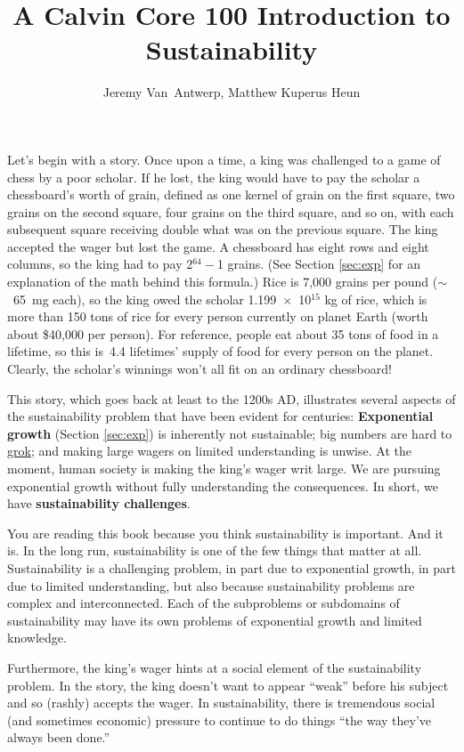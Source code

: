 \documentclass{article}\usepackage[]{graphicx}\usepackage[table]{xcolor}
\begin{document}
\title{A Calvin Core 100 Introduction to Sustainability}
\author{Jeremy Van~Antwerp, Matthew Kuperus Heun}

 
Let’s begin with a story.
Once upon a time, a king was challenged to a game of chess by a poor scholar.
If he lost, the king would have to pay the scholar a chessboard’s worth of
grain, defined as one kernel of grain on the first square, two grains on the second
square, four grains on the third square, and so on, with each subsequent square receiving
double what was on the previous square.
The king accepted the wager but lost the game.
A chessboard
has eight rows and eight columns, so the king had to pay 2$^\text{64}-$1
grains.
(See Section \ref{sec:exp} for an explanation of the math behind this formula.)
Rice is 7,000 grains per pound ($\sim$~65~mg each),
so the king owed the scholar 1.199~$\times$~10$^{\text{15}}$ kg of rice,
which is more than 150 tons of rice for every person currently on planet Earth
(worth about \$40,000 per person).
For reference, people eat about 35 tons of food in a lifetime,
so this is~4.4 lifetimes' supply of food for every person on the planet.
Clearly, the scholar's winnings won't all fit on an ordinary chessboard!

This story, which goes back at least to the 1200s AD, illustrates several aspects of the
sustainability problem that have been evident for centuries:
\textbf{Exponential growth} (Section \ref{sec:exp}) is
inherently not sustainable;
big numbers are hard to \href{https://en.wiktionary.org/wiki/grok}{grok};
and making large wagers on limited understanding is unwise.
At the moment, human society is making the king's wager writ large.
We are pursuing exponential growth without fully understanding the consequences.
In short, we have \textbf{sustainability challenges}.

You are reading this book because you think sustainability is important.
And it is.
In the long run, sustainability is one of the few things that matter at all.
Sustainability is a challenging problem, in part due to exponential growth,
in part due to limited understanding,
but also because sustainability problems are complex and interconnected.
Each of the subproblems or subdomains of sustainability may have its own problems
of exponential growth and limited knowledge.

Furthermore, the king's wager hints at a social element of the sustainability problem.
In the story, the king doesn't want to appear ``weak'' before his subject and so
(rashly) accepts the wager.
In sustainability, there is tremendous social (and sometimes economic) pressure
to continue to do things ``the way they've always been done.''
\end{document}
